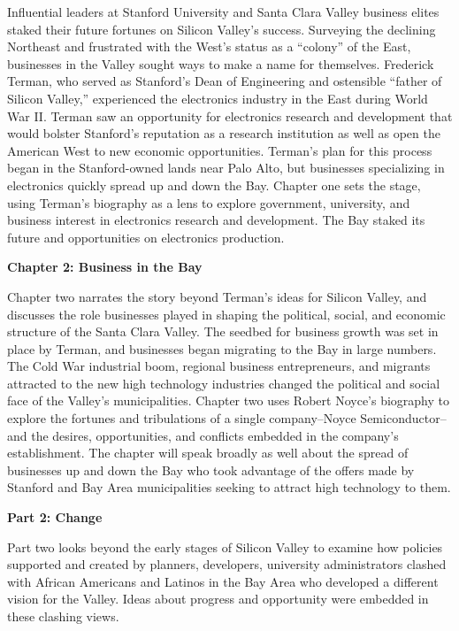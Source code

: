 \documentclass[11pt,article,oneside]{memoir}
\begin{document}
Influential leaders at Stanford University and Santa Clara Valley
business elites staked their future fortunes on Silicon Valley's
success. Surveying the declining Northeast and frustrated with the
West's status as a ``colony'' of the East, businesses in the Valley
sought ways to make a name for themselves. Frederick Terman, who served
as Stanford's Dean of Engineering and ostensible ``father of Silicon
Valley,'' experienced the electronics industry in the East during World
War II. Terman saw an opportunity for electronics research and
development that would bolster Stanford's reputation as a research
institution as well as open the American West to new economic
opportunities. Terman's plan for this process began in the
Stanford-owned lands near Palo Alto, but businesses specializing in
electronics quickly spread up and down the Bay. Chapter one sets the
stage, using Terman's biography as a lens to explore government,
university, and business interest in electronics research and
development. The Bay staked its future and opportunities on electronics
production.

\textbf{Chapter 2: Business in the Bay}

Chapter two narrates the story beyond Terman's ideas for Silicon Valley,
and discusses the role businesses played in shaping the political,
social, and economic structure of the Santa Clara Valley. The seedbed
for business growth was set in place by Terman, and businesses began
migrating to the Bay in large numbers. The Cold War industrial boom,
regional business entrepreneurs, and migrants attracted to the new high
technology industries changed the political and social face of the
Valley's municipalities. Chapter two uses Robert Noyce's biography to
explore the fortunes and tribulations of a single company--Noyce
Semiconductor--and the desires, opportunities, and conflicts embedded in
the company's establishment. The chapter will speak broadly as well
about the spread of businesses up and down the Bay who took advantage of
the offers made by Stanford and Bay Area municipalities seeking to
attract high technology to them.

\textbf{Part 2: Change}

Part two looks beyond the early stages of Silicon Valley to examine how
policies supported and created by planners, developers, university
administrators clashed with African Americans and Latinos in the Bay
Area who developed a different vision for the Valley. Ideas about
progress and opportunity were embedded in these clashing views.
\end{document}

